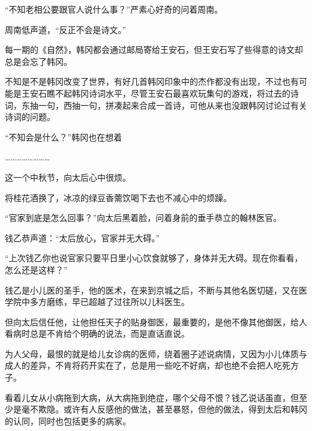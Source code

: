 “不知老相公要跟官人说什么事？”严素心好奇的问着周南。

周南低声道，“反正不会是诗文。”

每一期的《自然》，韩冈都会通过邮局寄给王安石，但王安石写了些得意的诗文却总是会忘了韩冈。

不知是不是韩冈改变了世界，有好几首韩冈印象中的杰作都没有出现，不过也有可能是王安石瞧不起韩冈诗词水平，尽管王安石最喜欢玩集句的游戏，将过去的诗词，东抽一句，西抽一句，拼凑起来合成一首诗，可他从来也没跟韩冈讨论过有关诗词的问题。

“不知会是什么？”韩冈也在想着

……………………

这一个中秋节，向太后心中很烦。

将桂花酒换了，冰凉的绿豆香薷饮喝下去也不减心中的烦躁。

“官家到底是怎么回事？”向太后黑着脸，问着身前的垂手恭立的翰林医官。

钱乙恭声道：“太后放心，官家并无大碍。”

“上次钱乙你也说官家只要平日里小心饮食就够了，身体并无大碍。现在你看看，怎么还是这样？”

钱乙是小儿医的圣手，他的医术，在来到京城之后，不断与其他名医切磋，又在医学院中多方磨练，早已超越了过往所以儿科医生。

但向太后信任他，让他担任天子的贴身御医，最重要的，是他不像其他御医，给人看病时总是不肯给个明确的说法，而是直话直说。

为人父母，最恨的就是给儿女诊病的医师，绕着圈子述说病情，又因为小儿体质与成人的差异，不肯将药开实在了，总是用一些吃不好病，却也绝不会把人吃死方子。

看着儿女从小病拖到大病，从大病拖到绝症，哪个父母不恨？钱乙说话虽直，但至少是毫不欺隐。或许有人反感他的做法，甚至暴怒，但他的做法，得到太后和韩冈的认同，同时也包括更多的病家。
